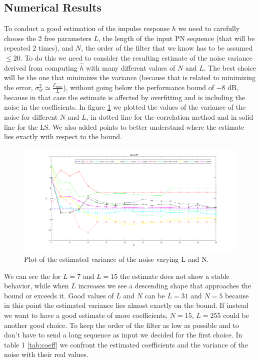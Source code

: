 \documentclass[a4paper,11.5pt]{article}
\begin{document}
\subsection*{Numerical Results}

To conduct a good estimation of the impulse response $h$ we need to carefully choose the 2 free parameters $L$, the length of the input PN sequence (that will be repeated 2 times), and $N$, the order of the filter that we know has to be assumed $\le20$. To do this we need to consider the resulting estimate of the noise variance derived from computing $\hat{h}$ with many different values of $N$ and $L$. The best choice will be the one that minimizes the variance (because that is related to minimizing the error, $\sigma_w^2\simeq \frac{\mathcal{E}_{min}}{L}$), without going below the performance bound of $-8$ dB, because in that case the estimate is affected by overfitting and is including the noise in the coefficients. In figure \ref{fig:L-N} we plotted the values of the variance of the noise for different $N$ and $L$, in dotted line for the correlation method and in solid line for the LS. We also added points to better understand where the estimate lies exactly with respect to the bound.
 \begin{figure}[ht]
	\begin{center}    
		\includegraphics[width=\textwidth]{figs/L-N-choice.png}
		\caption{Plot of the estimated variance of the noise varying L and N.}
		\label{fig:L-N}
	\end{center}
\end{figure} 
\noindent We can see the for $L=7$ and $L=15$ the estimate does not show a stable behavior, while when $L$ increases we see a descending shape that approaches the bound or exceeds it. Good values of $L$ and $N$ can be $L=31$ and $N=5$ because in this point the estimated variance lies almost exactly on the bound. If instead we want to have a good estimate of more coefficients, $N=15$, $L=255$ could be another good choice. To keep the order of the filter as low as possible and to don't have to send a long sequence as input we decided for the first choice. In table 1 \ref{tab:coeff} we confront the estimated coefficients and the variance of the noise with their real values.
\end{document}
